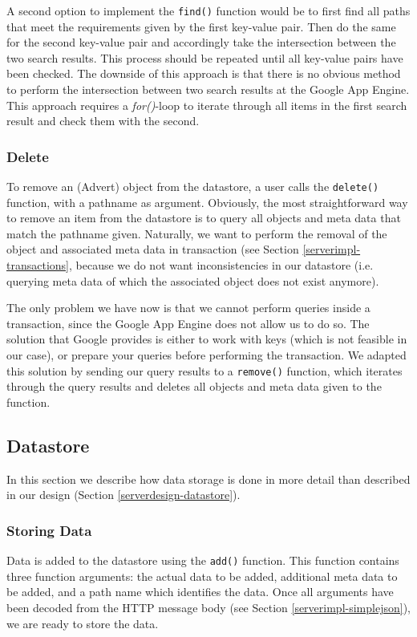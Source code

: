A second option to implement the \texttt{find()} function would be to first find
all paths that meet the requirements given by the first key-value pair. Then do
the same for the second key-value pair and accordingly take the intersection
between the two search results. This process should be repeated until all
key-value pairs have been checked. The downside of this approach is that there is
no obvious method to perform the intersection between two search results at the
Google App Engine. This approach requires a \emph{for()}-loop to iterate through
all items in the first search result and check them with the second.

\subsubsection{Delete}
To remove an (Advert) object from the datastore, a user calls the
\texttt{delete()} function, with a pathname as argument. Obviously, the most
straightforward way to remove an item from the datastore is to query all objects
and meta data that match the pathname given. Naturally, we want to perform the
removal of the object and associated meta data in transaction (see Section
\ref{serverimpl-transactions}, because we do not want inconsistencies in our
datastore (i.e. querying meta data of which the associated object does not exist
anymore).

The only problem we have now is that we cannot perform queries inside a
transaction, since the Google App Engine does not allow us to do so. The
solution that Google provides is either to work with keys (which is not
feasible in our case), or prepare your queries before performing the
transaction. We adapted this solution by sending our query results to a
\texttt{remove()} function, which iterates through the query results and
deletes all objects and meta data given to the function.

\subsection{Datastore}
In this section we describe how data storage is done in more detail than
described in our design (Section \ref{serverdesign-datastore}).

\subsubsection{Storing Data}
Data is added to the datastore using the \texttt{add()} function. This function
contains three function arguments: the actual data to be added, additional meta
data to be added, and a path name which identifies the data. Once all arguments
have been decoded from the HTTP message body (see Section
\ref{serverimpl-simplejson}), we are ready to store the data.

